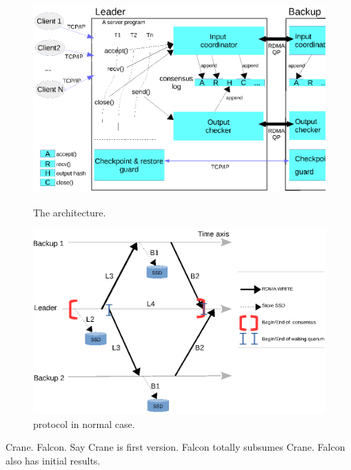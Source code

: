 \begin{figure}[!htb]
    \begin{minipage}{.49\textwidth}
        \includegraphics[width=0.34\textheight]{figures/arch.ps}
        \vspace{0.1in}
        \caption{The \falcon architecture.}
        \label{fig:falcon-arch}
    \end{minipage}
    \begin{minipage}{0.51\textwidth}
        \includegraphics[width=0.34\textheight]{figures/consensus.ps}
        \vspace{0.1in}
        \caption{\falcon protocol in normal case.}
        \label{fig:falcon-protocol}
    \end{minipage}
\end{figure}

 Crane. Falcon. Say Crane is first version. Falcon 
totally subsumes Crane. Falcon also has initial results.

